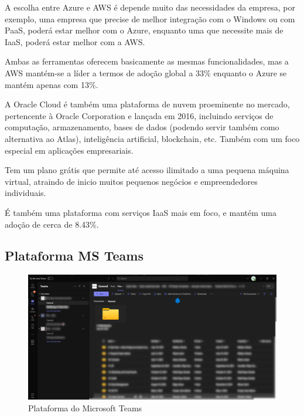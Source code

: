                 A escolha entre Azure e AWS é depende muito das necessidades da empresa, por exemplo, uma empresa que precise de melhor integração com o Windows ou com PaaS, poderá estar melhor com o Azure, enquanto uma que necessite mais de IaaS, poderá estar melhor com a AWS.
                
                Ambas as ferramentas oferecem basicamente as mesmas funcionalidades, mas a AWS mantém-se a líder a termos de adoção global a 33\% enquanto o Azure se mantém apenas com 13\%\cite{aws-vs-azure}.

            \label{competidores-oraclecloud}

                A Oracle Cloud é também uma plataforma de nuvem proeminente no mercado, pertencente à Oracle Corporation e lançada em 2016\cite{launch-orcale-cloud}, incluindo serviços de computação, armazenamento, bases de dados (podendo servir também como alternativa ao Atlas), inteligência artificial, blockchain, etc. Também com um foco especial em aplicações empresariais.

                Tem um plano grátis que permite até acesso ilimitado a uma pequena máquina virtual, atraindo de inicio muitos pequenos negócios e empreendedores individuais.

                É também uma plataforma com serviços IaaS mais em foco, e mantém uma adoção de cerca de 8.43\%\cite{marketshare-oracle-cloud}.

    \subsection{Plataforma MS Teams}
    
        \begin{figure}[htbp]
            \centering
            \includegraphics[width=\textwidth]{imgs/MSTeams.png} %
            \caption{Plataforma do Microsoft Teams}\label{fig:msteams-ui}
        \end{figure}

